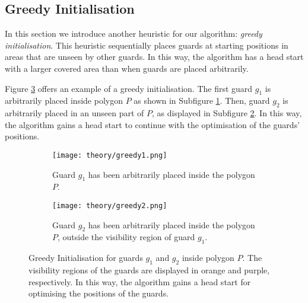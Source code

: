 \subsection{Greedy Initialisation}
\label{sec:greedy}
In this section we  introduce another heuristic for our algorithm: \textit{greedy initialisation}. This heuristic sequentially places guards at starting positions in areas that are unseen by other guards. In this way, the algorithm has a head start with a larger covered area than when guards are placed arbitrarily.

Figure \ref{fig:greedy} offers an example of a greedy initialisation. The first guard $g_1$ is arbitrarily placed inside polygon $P$ as shown in Subfigure \ref{fig:greedy1}. Then, guard $g_2$ is arbitrarily placed in an unseen part of $P$, as displayed in Subfigure \ref{fig:greedy2}. In this way, the algorithm gains a head start to continue with the optimisation of the guards' positions.

\begin{figure}[h!]
    \centering
    \begin{subfigure}{0.45\textwidth}
        \texttt{[image: theory/greedy1.png]}
        \caption{Guard $g_1$ has been arbitrarily placed inside the polygon $P$.}
        \label{fig:greedy1}
    \end{subfigure}
    \hfill
    \begin{subfigure}{0.45\textwidth}
        \texttt{[image: theory/greedy2.png]}
        \caption{Guard $g_2$ has been arbitrarily placed inside the polygon $P$, outside the visibility region of guard $g_1$.}
        \label{fig:greedy2}
    \end{subfigure}
    \caption{Greedy Initialisation for guards $g_1$ and $g_2$ inside polygon $P$. The visibility regions of the guards are displayed in orange and purple, respectively. In this way, the algorithm gains a head start for optimising the positions of the guards.}
    \label{fig:greedy}
\end{figure}
